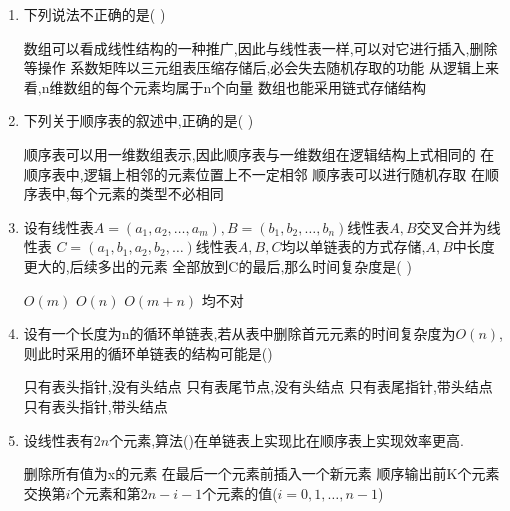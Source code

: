 \documentclass[12pt, a4paper, oneside, UTF8]{ctexbook}
\begin{document}
\begin{enumerate}
    \item 下列说法不正确的是(   ) 
    \begin{choices}[1]
        \task 数组可以看成线性结构的一种推广,因此与线性表一样,可以对它进行插入,删除等操作 
        \task 系数矩阵以三元组表压缩存储后,必会失去随机存取的功能
        \task 从逻辑上来看,n维数组的每个元素均属于n个向量
        \task 数组也能采用链式存储结构
    \end{choices}

    \item 下列关于顺序表的叙述中,正确的是(   ) 
    \begin{choices}[1]
        \task 顺序表可以用一维数组表示,因此顺序表与一维数组在逻辑结构上式相同的
        \task 在顺序表中,逻辑上相邻的元素位置上不一定相邻
        \task 顺序表可以进行随机存取
        \task 在顺序表中,每个元素的类型不必相同 
    \end{choices}

    \item 设有线性表$A=(a_1,a_2,\ldots,a_m),B=(b_1,b_2,\ldots,b_n)$线性表$A,B$交叉合并为线性表
    $C=(a_1,b_1,a_2,b_2,\ldots)$线性表$A,B,C$均以单链表的方式存储,$A,B$中长度更大的,后续多出的元素
    全部放到C的最后,那么时间复杂度是(    )
    \begin{choices}
        \task $O(m)$ \task $O(n)$ \task $O(m+n)$ \task 均不对
    \end{choices}

    \item 设有一个长度为n的循环单链表,若从表中删除首元元素的时间复杂度为$O(n)$,则此时采用的循环单链表的结构可能是()
    \begin{choices}[2]
        \task 只有表头指针,没有头结点 \task 只有表尾节点,没有头结点 
        \task 只有表尾指针,带头结点 \task 只有表头指针,带头结点
    \end{choices}

    \item 设线性表有$2n$个元素,算法()在单链表上实现比在顺序表上实现效率更高. 
    \begin{choices}[1]
        \task 删除所有值为x的元素 
        \task 在最后一个元素前插入一个新元素 
        \task 顺序输出前K个元素 
        \task 交换第$i$个元素和第$2n-i-1$个元素的值($i=0,1,\ldots,n-1$) 
    \end{choices}


\end{enumerate}
\end{document}
